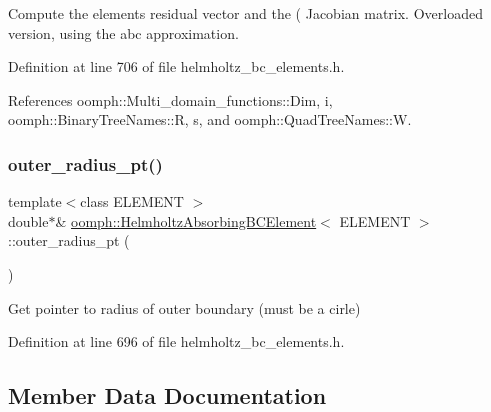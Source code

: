 Compute the element\textquotesingle{}s residual vector and the ( Jacobian matrix. Overloaded version, using the abc approximation. 



Definition at line 706 of file helmholtz\+\_\+bc\+\_\+elements.\+h.



References oomph\+::\+Multi\+\_\+domain\+\_\+functions\+::\+Dim, i, oomph\+::\+Binary\+Tree\+Names\+::R, s, and oomph\+::\+Quad\+Tree\+Names\+::W.

\mbox{\label{classoomph_1_1HelmholtzAbsorbingBCElement_a97ebf5721fa9f8928739b15781cfa296}} 
\subsubsection{\texorpdfstring{outer\+\_\+radius\+\_\+pt()}{outer\_radius\_pt()}}
{\footnotesize\ttfamily template$<$class E\+L\+E\+M\+E\+NT $>$ \\
double$\ast$\& \hyperlink{classoomph_1_1HelmholtzAbsorbingBCElement}{oomph\+::\+Helmholtz\+Absorbing\+B\+C\+Element}$<$ E\+L\+E\+M\+E\+NT $>$\+::outer\+\_\+radius\+\_\+pt (\begin{DoxyParamCaption}{ }\end{DoxyParamCaption})\hspace{0.3cm}{\ttfamily [inline]}}



Get pointer to radius of outer boundary (must be a cirle) 



Definition at line 696 of file helmholtz\+\_\+bc\+\_\+elements.\+h.



\subsection{Member Data Documentation}
\mbox{\label{classoomph_1_1HelmholtzAbsorbingBCElement_a36408a03895d4d23d3e1441f270fe96d}} 
